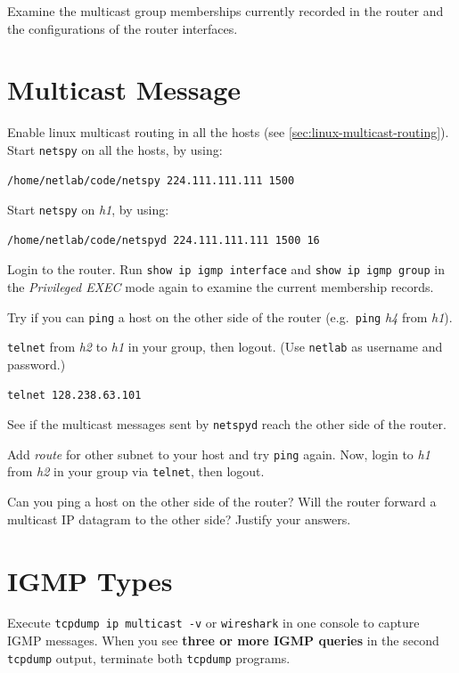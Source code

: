 \documentclass{../UTNetLab}
\begin{document}
    \begin{report}
    \item Examine the multicast group memberships currently recorded in the router and the configurations of the router interfaces.
    \end{report}

\section{Multicast Message}
    Enable linux multicast routing in all the hosts (see \autoref{sec:linux-multicast-routing}).\\
    Start \lstinline{netspy} on all the hosts, by using:
    \begin{lstlisting}
/home/netlab/code/netspy 224.111.111.111 1500
    \end{lstlisting}
    Start \lstinline{netspy} on \textit{h1}, by using:
    \begin{lstlisting}
/home/netlab/code/netspyd 224.111.111.111 1500 16
    \end{lstlisting}
    
    Login to the router.
    Run \lstinline[language={cisco}]{show ip igmp interface} and \lstinline[language={cisco}]{show ip igmp group} in the \textit{Privileged EXEC} mode again to examine the current membership records.

    Try if you can \lstinline{ping} a host on the other side of the router (e.g.\ \lstinline{ping} \textit{h4} from \textit{h1}).

    \lstinline{telnet} from \textit{h2} to \textit{h1} in your group, then logout. (Use \texttt{netlab} as username and password.)
    \begin{lstlisting}
telnet 128.238.63.101
    \end{lstlisting}
    See if the multicast messages sent by \lstinline{netspyd} reach the other side of the router.

    Add \textit{route} for other subnet to your host and try \lstinline{ping} again.
    Now, login to \textit{h1} from \textit{h2} in your group via \lstinline{telnet}, then logout.
    
    \begin{report}
    \item Can you ping a host on the other side of the router?
    Will the router forward a multicast IP datagram to the other side?
    Justify your answers.
    \end{report}

\section{IGMP Types}
    Execute \lstinline{tcpdump ip multicast -v} or \lstinline{wireshark} in one console to capture IGMP messages.
    When you see \textbf{three or more IGMP queries} in the second \lstinline{tcpdump} output, terminate both \lstinline{tcpdump} programs.
\end{document}
